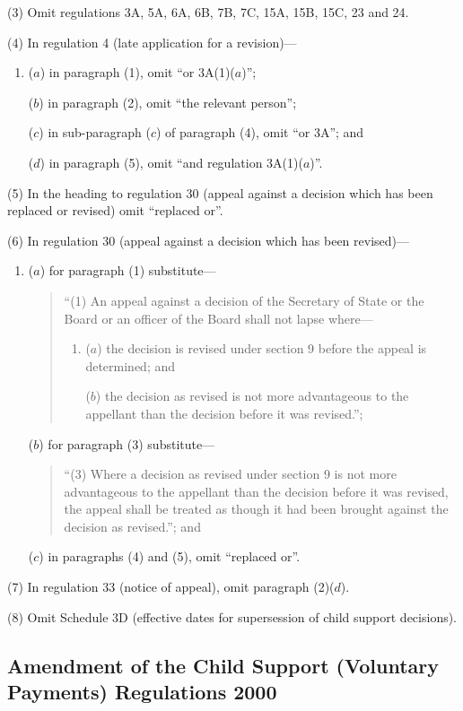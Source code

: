 \documentclass[12pt,a4paper]{article}
\begin{document}
(3) Omit regulations 3A, 5A, 6A, 6B, 7B, 7C, 15A, 15B, 15C, 23 and 24.

(4) In regulation 4 (late application for a revision)—
\begin{enumerate}\item[]
($a$) in paragraph (1), omit “or 3A(1)($a$)”;

($b$) in paragraph (2), omit “the relevant person”;

($c$) in sub-paragraph ($c$)  of paragraph (4), omit “or 3A”; and

($d$) in paragraph (5), omit “and regulation 3A(1)($a$)”.
\end{enumerate}

(5) In the heading to regulation 30 (appeal against a decision which has been replaced or revised) omit “replaced or”.

(6) In regulation 30 (appeal against a decision which has been revised)—
\begin{enumerate}\item[]
($a$) for paragraph (1) substitute—
\begin{quotation}
“(1) An appeal against a decision of the Secretary of State or the Board or an officer of the Board shall not lapse where—
\begin{enumerate}\item[]
($a$) the decision is revised under section 9 before the appeal is determined; and

($b$) the decision as revised is not more advantageous to the appellant than the decision before it was revised.”;
\end{enumerate}
\end{quotation}

($b$) for paragraph (3) substitute—
\begin{quotation}
“(3) Where a decision as revised under section 9 is not more advantageous to the appellant than the decision before it was revised, the appeal shall be treated as though it had been brought against the decision as revised.”; and
\end{quotation}

($c$) in paragraphs (4) and (5), omit “replaced or”.
\end{enumerate}

(7) In regulation 33 (notice of appeal), omit paragraph (2)($d$).

(8) Omit Schedule 3D (effective dates for supersession of child support decisions).

\subsection[7. Amendment of the Child Support (Voluntary Payments) Regulations 2000]{\sloppy Amendment of the Child Support (Voluntary Payments) Regulations 2000}
\end{document}
